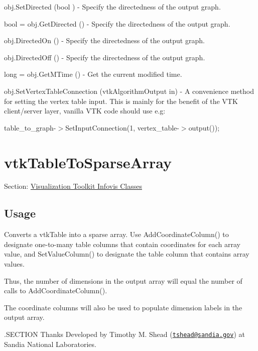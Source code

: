 \begin{DoxyItemize}
\item {\ttfamily obj.\-Set\-Directed (bool )} -\/ Specify the directedness of the output graph.  
\item {\ttfamily bool = obj.\-Get\-Directed ()} -\/ Specify the directedness of the output graph.  
\item {\ttfamily obj.\-Directed\-On ()} -\/ Specify the directedness of the output graph.  
\item {\ttfamily obj.\-Directed\-Off ()} -\/ Specify the directedness of the output graph.  
\item {\ttfamily long = obj.\-Get\-M\-Time ()} -\/ Get the current modified time.  
\item {\ttfamily obj.\-Set\-Vertex\-Table\-Connection (vtk\-Algorithm\-Output in)} -\/ A convenience method for setting the vertex table input. This is mainly for the benefit of the V\-T\-K client/server layer, vanilla V\-T\-K code should use e.\-g\-:

table\-\_\-to\-\_\-graph-\/$>$Set\-Input\-Connection(1, vertex\-\_\-table-\/$>$output());


\end{DoxyItemize}\hypertarget{vtkinfovis_vtktabletosparsearray}{}\section{vtk\-Table\-To\-Sparse\-Array}\label{vtkinfovis_vtktabletosparsearray}
Section\-: \hyperlink{sec_vtkinfovis}{Visualization Toolkit Infovis Classes} \hypertarget{vtkwidgets_vtkxyplotwidget_Usage}{}\subsection{Usage}\label{vtkwidgets_vtkxyplotwidget_Usage}
Converts a vtk\-Table into a sparse array. Use Add\-Coordinate\-Column() to designate one-\/to-\/many table columns that contain coordinates for each array value, and Set\-Value\-Column() to designate the table column that contains array values.

Thus, the number of dimensions in the output array will equal the number of calls to Add\-Coordinate\-Column().

The coordinate columns will also be used to populate dimension labels in the output array.

.S\-E\-C\-T\-I\-O\-N Thanks Developed by Timothy M. Shead (\href{mailto:tshead@sandia.gov}{\tt tshead@sandia.\-gov}) at Sandia National Laboratories.

